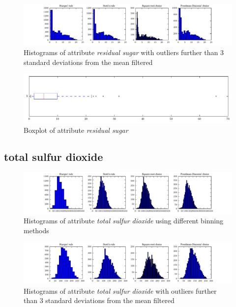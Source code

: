 \documentclass{report}
\begin{document}
\begin{figure}[H]
\includegraphics[width=\textwidth]{histograms/residual_sugar_filtered.pdf}
\caption{Histograms of attribute \emph{residual sugar} with outliers further than 3 standard deviations from the mean filtered}\n\end{figure}

\begin{figure}[H]
\includegraphics[width=\textwidth]{boxplots/residual_sugar.pdf}
\caption{Boxplot of attribute \emph{residual sugar}}\end{figure}

\newpage\subsection{total sulfur dioxide}
\begin{figure}[H]
\includegraphics[width=\textwidth]{histograms/total_sulfur_dioxide.pdf}
\caption{Histograms of attribute \emph{total sulfur dioxide} using different binning methods}\end{figure}

\begin{figure}[H]
\includegraphics[width=\textwidth]{histograms/total_sulfur_dioxide_filtered.pdf}
\caption{Histograms of attribute \emph{total sulfur dioxide} with outliers further than 3 standard deviations from the mean filtered}\n\end{figure}
\end{document}
